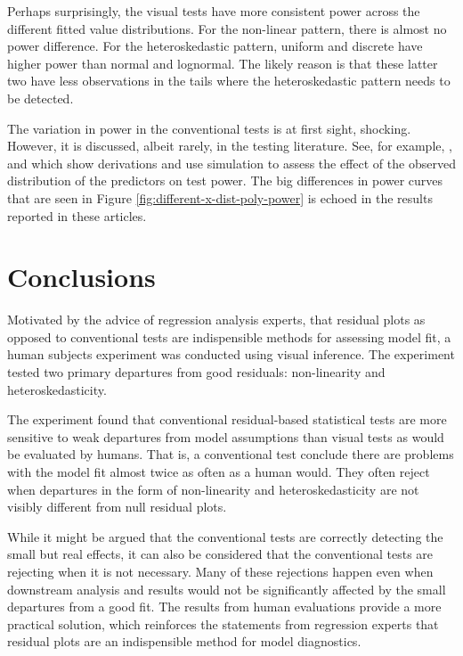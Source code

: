 \documentclass[]{interact}
\theoremstyle{plain}%
\theoremstyle{definition}
\theoremstyle{remark}
\begin{document}
Perhaps surprisingly, the visual tests have more consistent power across
the different fitted value distributions. For the non-linear pattern,
there is almost no power difference. For the heteroskedastic pattern,
uniform and discrete have higher power than normal and lognormal. The
likely reason is that these latter two have less observations in the
tails where the heteroskedastic pattern needs to be detected.

The variation in power in the conventional tests is at first sight,
shocking. However, it is discussed, albeit rarely, in the testing
literature. See, for example, \citet{jamshidian2007study},
\citet{olvera2019relationship} and \citet{zhang2018practical} which show
derivations and use simulation to assess the effect of the observed
distribution of the predictors on test power. The big differences in
power curves that are seen in Figure
\ref{fig:different-x-dist-poly-power} is echoed in the results reported
in these articles.

\hypertarget{conclusions}{%
\section{Conclusions}\label{conclusions}}

Motivated by the advice of regression analysis experts, that residual
plots as opposed to conventional tests are indispensible methods for
assessing model fit, a human subjects experiment was conducted using
visual inference. The experiment tested two primary departures from good
residuals: non-linearity and heteroskedasticity.

The experiment found that conventional residual-based statistical tests
are more sensitive to weak departures from model assumptions than visual
tests as would be evaluated by humans. That is, a conventional test
conclude there are problems with the model fit almost twice as often as
a human would. They often reject when departures in the form of
non-linearity and heteroskedasticity are not visibly different from null
residual plots.

While it might be argued that the conventional tests are correctly
detecting the small but real effects, it can also be considered that the
conventional tests are rejecting when it is not necessary. Many of these
rejections happen even when downstream analysis and results would not be
significantly affected by the small departures from a good fit. The
results from human evaluations provide a more practical solution, which
reinforces the statements from regression experts that residual plots
are an indispensible method for model diagnostics.
\end{document}
